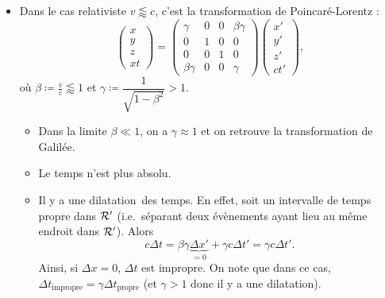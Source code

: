 \begin{itemize}
                \item Dans le cas relativiste $v\lessapprox c$, c'est la transformation de Poincaré-Lorentz :
                \begin{equation}
                    \begin{pmatrix}
                        x\\y\\z\\xt
                    \end{pmatrix}=\begin{pmatrix}
                        \gamma&0&0&\beta\gamma\\
                        0&1&0&0\\
                        0&0&1&0\\
                        \beta\gamma&0&0&\gamma
                    \end{pmatrix}\begin{pmatrix}
                        x'\\y'\\z'\\ct'
                    \end{pmatrix},
                \end{equation}
                où $\beta\coloneqq\frac{v}{c}\lessapprox1$ et $\gamma\coloneqq\dfrac{1}{\sqrt{1-\beta^{2}}}>1$.
                \begin{itemize}[label=$\longrightarrow$]
                    \item Dans la limite $\beta\ll1$, on a $\gamma\approx1$ et on retrouve la transformation de Galilée.
                    \item Le temps n'est plus absolu.
                    \item Il y a une \og dilatation\fg~des temps. En effet, soit un intervalle de temps propre dans $\mathcal{R}'$ (i.e.~séparant deux évènements ayant lieu au même endroit dans $\mathcal{R}'$). Alors 
                    \begin{equation}
                        c\Delta t=\beta\gamma\underbrace{\Delta x'}_{=0}+\gamma c\Delta t'=\gamma c\Delta t'.
                    \end{equation}
                    Ainsi, si $\Delta x=0$, $\Delta t$ est \og impropre\fg. On note que dans ce cas, $\Delta t_{\text{impropre}}=\gamma\Delta t_{\text{propre}}$ (et $\gamma>1$ donc il y a une \og dilatation\fg).
                \end{itemize}
            \end{itemize}

